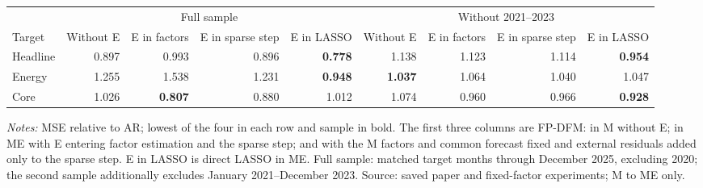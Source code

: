 \begin{threeparttable}
\begin{tabular}{@{}lrrrrrrrr@{}}
\toprule
 & \multicolumn{4}{c}{Full sample} & \multicolumn{4}{c}{Without 2021--2023} \\
\cmidrule(lr){2-5} \cmidrule(lr){6-9}
Target & Without E & E in factors & E in sparse step & E in LASSO & Without E & E in factors & E in sparse step & E in LASSO \\
\midrule
Headline & 0.897 & 0.993 & 0.896 & \textbf{0.778} & 1.138 & 1.123 & 1.114 & \textbf{0.954} \\
Energy & 1.255 & 1.538 & 1.231 & \textbf{0.948} & \textbf{1.037} & 1.064 & 1.040 & 1.047 \\
Core & 1.026 & \textbf{0.807} & 0.880 & 1.012 & 1.074 & 0.960 & 0.966 & \textbf{0.928} \\
\bottomrule
\end{tabular}
\begin{tablenotes}[flushleft]\footnotesize
\item \textit{Notes:} MSE relative to AR; lowest of the four in each row and sample in bold. The first three columns are FP-DFM: in M without E; in ME with E entering factor estimation and the sparse step; and with the M factors and common forecast fixed and external residuals added only to the sparse step. E in LASSO is direct LASSO in ME. Full sample: matched target months through December 2025, excluding 2020; the second sample additionally excludes January 2021--December 2023. Source: saved paper and fixed-factor experiments; M to ME only.
\end{tablenotes}
\end{threeparttable}
